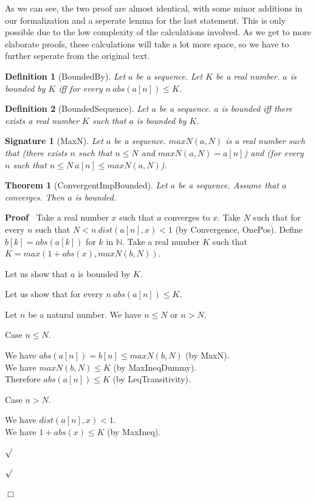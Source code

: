 \documentclass{article}
\newenvironment{forthel}{\begin{leftbar}}{\end{leftbar}}
\newenvironment{proof}{\noindent\textbf{Proof\ }}{\hspace*{\fill}$\Box$\medskip}
\newenvironment{subproof}{\begin{list}{}{}
		\item[\text{Proof}]}{\hfill $\surd$ \end{list}}
\newenvironment{case}{\begin{list}{}{}
		\item[]}{\end{list}}
\newtheorem{theorem}{Theorem}
\newtheorem{definition}{Definition}
\newtheorem{signature}{Signature}
\newcommand{\NN}{\mathbb{N}}
\begin{document}
\noindent As we can see, the two proof are almost identical, with some minor additions in our formalization and a seperate lemma for the last statement. This is only possible due to the low complexity of the calculations involved. As we get to more elaborate proofs, these calculations will take a lot more space, so we have to further seperate from the original text.

\begin{forthel}
	\begin{definition}[BoundedBy]
		Let $a$ be a sequence. Let $K$ be a real number. $a$ is bounded by $K$ iff
		for every $n \ abs(a[n]) \leq K$.
	\end{definition}
	
	\begin{definition}[BoundedSequence]
		Let $a$ be a sequence. $a$ is bounded iff there exists a real number $K$ such that
		$a$ is bounded by $K$.
	\end{definition}
	
	\begin{signature}[MaxN]
		Let $a$ be a sequence. $maxN(a,N)$ is a real number such that
		(there exists $n$ such that $n \leq N$ and $maxN(a,N) = a[n]$) and
		(for every $n$ such that $n \leq N \ a[n] \leq maxN(a,N)$).
	\end{signature}
	
	\begin{theorem}[ConvergentImpBounded]
		Let $a$ be a sequence. Assume that $a$ converges. Then $a$ is bounded.
	\end{theorem}

	\begin{proof}
		Take a real number $x$ such that $a$ converges to $x$.
		Take $N$ such that for every $n$ such that $N < n \ dist(a[n],x) < 1$ (by Convergence, OnePos).
		Define $b[k] = abs(a[k])$ for $k$ in $\NN$.
		Take a real number $K$ such that $K = max(1 + abs(x), maxN(b,N))$.
		
		\noindent Let us show that $a$ is bounded by $K$.
		\begin{subproof}
			Let us show that for every $n \ abs(a[n]) \leq K$.
			\begin{subproof} 
				Let $n$ be a natural number.
				We have $n \leq N$ or $n > N$.
				
				Case $n \leq N$.
				\begin{case}
					We have $abs(a[n]) = b[n] \leq maxN(b,N)$ (by MaxN).\\
					We have $maxN(b,N) \leq K$ (by MaxIneqDummy).\\
					Therefore $abs(a[n]) \leq K$ (by LeqTransitivity).
				\end{case}
				Case $n > N$.
				\begin{case}
					We have $dist(a[n],x) < 1$.\\
					We have $1 + abs(x) \leq K$ (by MaxIneq).
					

\end{case}
\end{subproof}
\end{subproof}
\end{proof}
\end{forthel}
\end{document}
